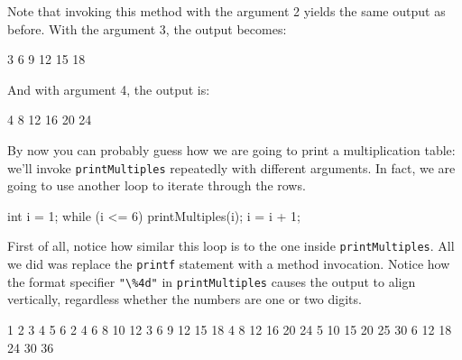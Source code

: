 \documentclass[12pt]{book}
\makeatletter
\renewcommand{\section}{\@startsection {section}{1}{\z@}%
    {-3.5ex \@plus -1ex \@minus -.2ex}%
    {0.7ex \@plus.2ex}%
    {\normalfont\Large\bfseries}}
\theoremstyle{exercise}
\newcommand{\java}[1]{\lstinline{#1}} %
\makeatother
\begin{document}
Note that invoking this method with the argument 2 yields the same output as before.
With the argument 3, the output becomes:

\begin{stdout}
    3    6    9   12   15   18
\end{stdout}

And with argument 4, the output is:

\begin{stdout}
    4    8   12   16   20   24
\end{stdout}

By now you can probably guess how we are going to print a multiplication table: we'll invoke {\tt printMultiples} repeatedly with different arguments.
In fact, we are going to use another loop to iterate through the rows.

\begin{code}
    int i = 1;
    while (i <= 6) {
        printMultiples(i);
        i = i + 1;
    }
\end{code}

First of all, notice how similar this loop is to the one inside {\tt printMultiples}.
All we did was replace the \java{printf} statement with a method invocation.
Notice how the format specifier \java{"\%4d"} in {\tt printMultiples} causes the output to align vertically, regardless whether the numbers are one or two digits.

\begin{stdout}
    1    2    3    4    5    6
    2    4    6    8   10   12
    3    6    9   12   15   18
    4    8   12   16   20   24
    5   10   15   20   25   30
    6   12   18   24   30   36
\end{stdout}

%
%
\end{document}
